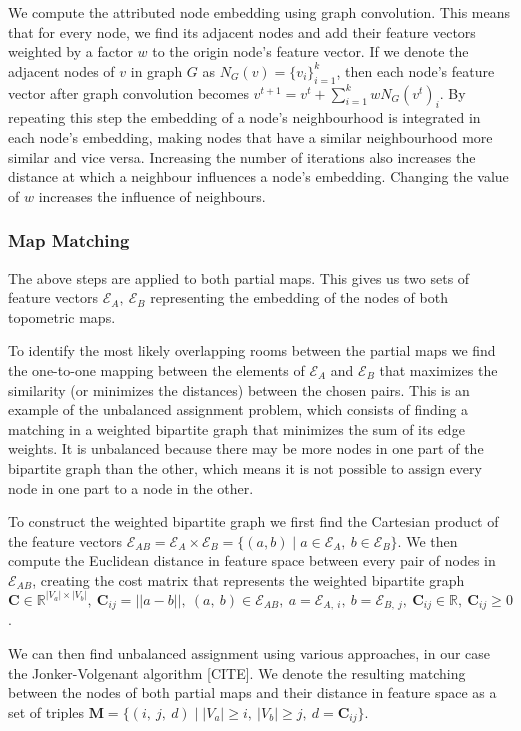 We compute the attributed node embedding using graph convolution. This means that for every node, we find its adjacent nodes and add their feature vectors weighted by a factor \(w\) to the origin node's feature vector. If we denote the adjacent nodes of \(v\) in graph \(G\) as \(N_{G}(v) = \{v_i\}_{i=1}^{k}\), then each node's feature vector after graph convolution becomes \(v^{t+1} = v^t + \sum_{i=1}^k wN_{G}(v^t)_i\). By repeating this step the embedding of a node's neighbourhood is integrated in each node's embedding, making nodes that have a similar neighbourhood more similar and vice versa. Increasing the number of iterations also increases the distance at which a neighbour influences a node's embedding. Changing the value of \(w\) increases the influence of neighbours. 

\subsubsection{Map Matching}
The above steps are applied to both partial maps. This gives us two sets of feature vectors \(\mathcal{E}_A,\ \mathcal{E}_B\) representing the embedding of the nodes of both topometric maps.

To identify the most likely overlapping rooms between the partial maps we find the one-to-one mapping between the elements of \(\mathcal{E}_A\) and \(\mathcal{E}_B\) that maximizes the similarity (or minimizes the distances) between the chosen pairs. This is an example of the unbalanced assignment problem, which consists of finding a matching in a weighted bipartite graph that minimizes the sum of its edge weights. It is unbalanced because there may be more nodes in one part of the bipartite graph than the other, which means it is not possible to assign every node in one part to a node in the other. 

To construct the weighted bipartite graph we first find the Cartesian product of the feature vectors \(\mathcal{E}_{AB} = \mathcal{E}_A \times \mathcal{E}_B = \{(a,b) \mid a \in \mathcal{E}_A,\ b \in \mathcal{E}_B\}\). We then compute the Euclidean distance in feature space between every pair of nodes in \(\mathcal{E}_{AB}\), creating the cost matrix that represents the weighted bipartite graph \(\mathbf{C} \in \mathbb{R}^{|V_a| \times |V_b|},\ \mathbf{C}_{ij} = ||a - b||,\ (a,\ b) \in \mathcal{E}_{AB},\ a = \mathcal{E}_{A,\ i},\ b = \mathcal{E}_{B,\ j},\ \mathbf{C}_{ij} \in \mathbb{R},\ \mathbf{C}_{ij} \geq 0\).

We can then find unbalanced assignment using various approaches, in our case the Jonker-Volgenant algorithm [CITE]. We denote the resulting matching between the nodes of both partial maps and their distance in feature space as a set of triples \(\mathbf{M} = \{(i,\ j,\ d) \mid  |V_a| \geq i,\ |V_b|\geq j,\ d = \mathbf{C}_{ij}\}\). 

